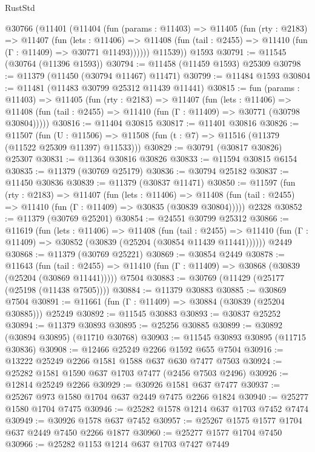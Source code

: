\begin{lexlean}{RustStd}
\begin{coremodule}
    @30766
      (@11401
        (@11404
          (fun (params : @11403) =>
          @11405
            (fun (rty : @2183) =>
            @11407
              (fun (lets : @11406) =>
              @11408 (fun (tail : @2455) => @11410 (fun (Γ : @11409) => @30771 @11493))))))
        @11539))
    @1593
@30791 := @11545 (@30764 (@11396 @1593))
@30794 := @11458 (@11459 @1593) @25309
@30798 := @11379 (@11450 (@30794 @11467) @11471)
@30799 := @11484 @1593
@30804 := @11481 (@11483 @30799 @25312 @11439 @11441)
@30815 := fun (params : @11403) =>
  @11405
    (fun (rty : @2183) =>
    @11407
      (fun (lets : @11406) =>
      @11408 (fun (tail : @2455) => @11410 (fun (Γ : @11409) => @30771 (@30798 @30804)))))
@30816 := @11404 @30815
@30817 := @11401 @30816
@30826 := @11507
    (fun (U : @11506) => @11508 (fun (t : @7) => @11516 (@11379 (@11522 @25309 @11397) @11533)))
@30829 := @30791 (@30817 @30826) @25307
@30831 := @11364 @30816 @30826
@30833 := @11594 @30815 @6154
@30835 := @11379 (@30769 @25179)
@30836 := @30794 @25182
@30837 := @11450 @30836
@30839 := @11379 (@30837 @11471)
@30850 := @11597
    (fun (rty : @2183) =>
    @11407
      (fun (lets : @11406) =>
      @11408 (fun (tail : @2455) => @11410 (fun (Γ : @11409) => @30835 (@30839 @30804)))))
    @2328
@30852 := @11379 (@30769 @25201)
@30854 := @24551 @30799 @25312
@30866 := @11619
    (fun (lets : @11406) =>
    @11408
      (fun (tail : @2455) =>
      @11410 (fun (Γ : @11409) => @30852 (@30839 (@25204 (@30854 @11439 @11441))))))
    @2449
@30868 := @11379 (@30769 @25221)
@30869 := @30854 @2449
@30878 := @11643
    (fun (tail : @2455) => @11410 (fun (Γ : @11409) => @30868 (@30839 (@25204 (@30869 @11441)))))
    @7504
@30883 := @30769 (@11429 (@25177 (@25198 (@11438 @7505))))
@30884 := @11379 @30883
@30885 := @30869 @7504
@30891 := @11661 (fun (Γ : @11409) => @30884 (@30839 (@25204 @30885))) @25249
@30892 := @11545 @30883
@30893 := @30837 @25252
@30894 := @11379 @30893
@30895 := @25256 @30885
@30899 := @30892 (@30894 @30895) (@11710 @30768)
@30903 := @11545 @30893 @30895 (@11715 @30836)
@30908 := @12466 @25249 @2266 @1592 @655 @7504
@30916 := @13222 @25249 @2266 @1581 @1588 @637 @630 @7477 @7503
@30924 := @25282 @1581 @1590 @637 @1703 @7477 (@2456 @7503 @2496)
@30926 := @12814 @25249 @2266
@30929 := @30926 @1581 @637 @7477
@30937 := @25267 @973 @1580 @1704 @637 @2449 @7475 @2266 @1824
@30940 := @25277 @1580 @1704 @7475
@30946 := @25282 @1578 @1214 @637 @1703 @7452 @7474
@30949 := @30926 @1578 @637 @7452
@30957 := @25267 @1575 @1577 @1704 @637 @2449 @7450 @2266 @1877
@30960 := @25277 @1577 @1704 @7450
@30966 := @25282 @1153 @1214 @637 @1703 @7427 @7449

\end{coremodule}
\end{lexlean}
